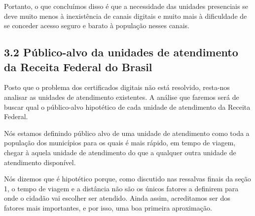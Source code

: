 \documentclass[]{article}
\begin{document}
Portanto, o que concluímos disso é que a necessidade das unidades
presenciais se deve muito menos à inexistência de canais digitais e
muito mais à dificuldade de se conceder acesso seguro e barato à
população nesses canais.

\hypertarget{publico-alvo-da-unidades-de-atendimento-da-receita-federal-do-brasil}{%
\subsection{3.2 Público-alvo da unidades de atendimento da Receita
Federal do
Brasil}\label{publico-alvo-da-unidades-de-atendimento-da-receita-federal-do-brasil}}

Posto que o problema dos certificados digitais não está resolvido,
resta-nos analisar as unidades de atendimento existentes. A análise que
faremos será de buscar qual o público-alvo hipotético de cada unidade de
atendimento da Receita Federal.

Nós estamos definindo público alvo de uma unidade de atendimento como
toda a população dos municípios para os quais é mais rápido, em tempo de
viagem, chegar à aquela unidade de atendimento do que a qualquer outra
unidade de atendimento disponível.

Nós dizemos que é hipotético porque, como discutido nas ressalvas finais
da seção 1, o tempo de viagem e a distância não são os únicos fatores a
definirem para onde o cidadão vai escolher ser atendido. Ainda assim,
acreditamos ser dos fatores mais importantes, e por isso, uma boa
primeira aproximação.
\end{document}
